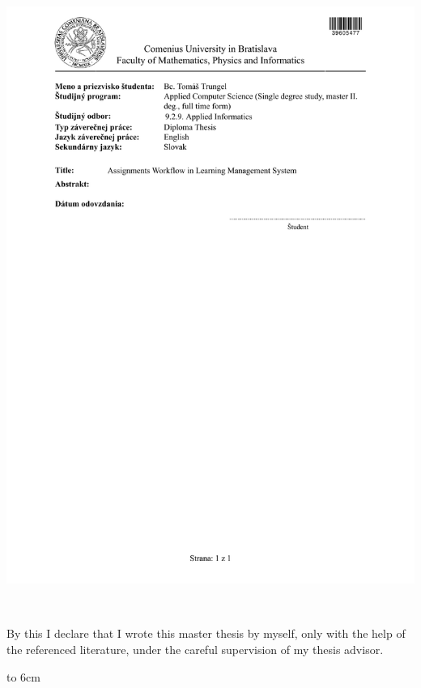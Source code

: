 \documentclass[12pt, oneside]{book}
\begin{document}
\newpage 
\thispagestyle{empty}
\hspace{-2cm}\includegraphics[width=1.1\textwidth]{images/zadanie}


\newpage

\noindent
\begin{minipage}{0.25\textwidth}~\end{minipage}
\begin{minipage}{0.68\textwidth}
By this I declare that I wrote this master thesis by myself, only with the help of the referenced literature, under the careful supervision of my thesis advisor.
\bigskip\bigskip

\hfill\hbox to 6cm{\dotfill}
\end{minipage}
\vfill\eject %
~\vfill\eject %


\end{document}

